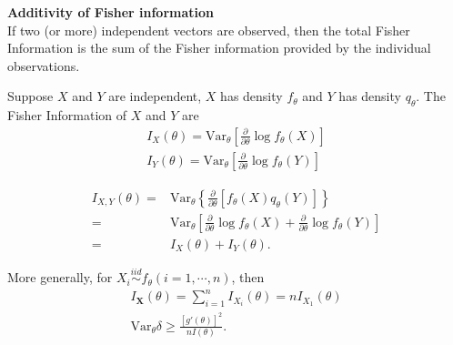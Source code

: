 \begin{example}
    \textbf{Additivity of Fisher information}\\
    If two (or more) independent vectors are observed,
    then the total Fisher Information is the sum of the Fisher information 
    provided by the individual observations.
    
    Suppose $X$ and $Y$ are independent, 
    $X$ has density $f_\theta$ and $Y$ has density $q_\theta$.
    The Fisher Information of $X$ and $Y$ are 
    \begin{gather}
        I_X(\theta)=\mathrm{Var}_\theta\left[\frac{\partial}{\partial\theta}\log{f_\theta(X)}\right]\\
        I_Y(\theta)=\mathrm{Var}_\theta\left[\frac{\partial}{\partial\theta}\log{f_\theta(Y)}\right]
    \end{gather}
    
    \begin{align}
        I_{X,Y}(\theta)
        =& \mathrm{Var}_\theta \left\{ \frac{\partial}{\partial{\theta}}[f_\theta(X)q_\theta(Y)] \right\} \\
        =& \mathrm{Var}_\theta \left[ \frac{\partial}{\partial{\theta}}\log{f_\theta(X)} + \frac{\partial}{\partial{\theta}}\log{f_\theta(Y)} \right] \\
        =& I_X(\theta) + I_Y(\theta).
    \end{align}
    
    More generally, for $X_i\overset{iid}{\sim}f_\theta (i=1,\cdots,n)$, then
    \begin{gather}
        I_{\boldsymbol{X}}(\theta) = \sum_{i=1}^n{I_{X_i}(\theta)} = nI_{X_1}(\theta) \\
        \mathrm{Var}_\theta\delta\geq\frac{[g'(\theta)]^2}{nI(\theta)}.
    \end{gather}
\end{example}

